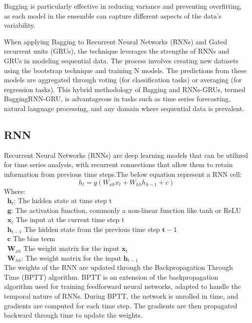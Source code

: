\documentclass{ieeeojies}
\begin{document}
Bagging is particularly effective in reducing variance and preventing overfitting, as each model in the ensemble can capture different aspects of the data's variability.

When applying Bagging to Recurrent Neural Networks (RNNs) and Gated recurrent units (GRUs), the technique leverages the strengths of RNNs and GRUs in modeling sequential data. The process involves creating new datasets using the bootstrap technique and training N models. The predictions from these models are aggregated through voting (for classification tasks) or averaging (for regression tasks). 
This hybrid methodology of Bagging and RNNs-GRUs, termed BaggingRNN-GRU, is advantageous in tasks such as time series forecasting, natural language processing, and any domain where sequential data is prevalent.

\subsection{RNN}
Recurrent Neural Networks (RNNs) are deep learning models that can be utilized for time series analysis, with recurrent connections that allow them to retain information from previous time steps\cite{b10}.The below equation represent a RNN cell:
\[h_t = g(W_{xh}x_t + W_{hh}h_{h-1} + c) \]
Where: \\ 
        \indent\textbullet\ \(\mathbf h_{t}\): The hidden state at time step t\\
        \indent\textbullet\ \(\mathbf g\): The activation function, commonly a non-linear function like tanh or ReLU\\
        \indent\textbullet\ \(\mathbf x_t\)\: The input at the current time step t\\
        \indent\textbullet\ \(\mathbf h_{t-1}\)\: The hidden state from the previous time step  \(\mathbf t-1\)\\
        \indent\textbullet\ \(\mathbf c \)\: The bias term\\
        \indent\textbullet\ \(\mathbf W_{xh}\)\: The weight matrix for the input \(\mathbf x_t\) \\
        \indent\textbullet\ \(\mathbf W_{hh}\): The weight matrix for the input \(\mathbf h_{t-1}\)\\

The weights of the RNN are updated through the Backpropagation Through Time (BPTT) algorithm. BPTT is an extension of the backpropagation algorithm used for training feedforward neural networks, adapted to handle the temporal nature of RNNs. During BPTT, the network is unrolled in time, and gradients are computed for each time step. The gradients are then propagated backward through time to update the weights.
\end{document}
